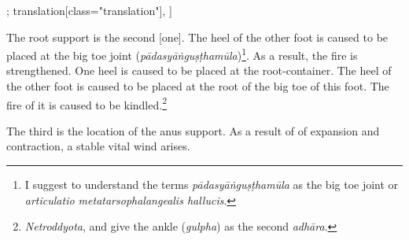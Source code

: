 \begin{alignment}[
  texts=edition[class="edition"];
  translation[class="translation"],
  ]
\begin{translation}
\begin{tlate}[p30_01]
      The root support is the second [one]. The heel of the other foot is caused to be placed at the big toe joint (\textit{pādasyāṅguṣṭhamūla})\footnote{I suggest to understand the terms \textit{pādasyāṅguṣṭhamūla} as the big toe joint or \textit{articulatio metatarsophalangealis hallucis}.}. As a result, the fire is strengthened. One heel is caused to be placed at the root-container. The heel of the other foot is caused to be placed at the root of the big toe of this foot. The fire of it is caused to be kindled.\footnote{\textit{Netroddyota},  and  give the ankle (\textit{gulpha}) as the second \textit{adhāra}.}
      
      The third is the location of the anus support. As a result of of expansion and contraction, a stable vital wind arises. 
      \flushpage 
    \end{tlate}
  \end{translation}
\end{alignment}
\pagebreak %
